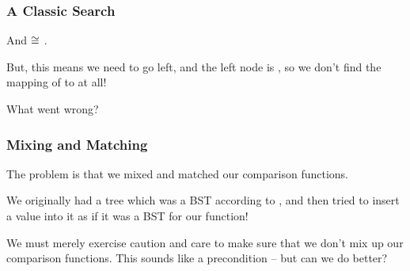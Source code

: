 \documentclass[aspectratio=169]{beamer}
\begin{document}
\begin{frame}[fragile]
  \frametitle{A Classic Search}

  \begin{center}

    \vspace{10pt}

  \end{center}

  And  $\cong$ .

  But, this means we need to go left, and the left node is , so
  we don't find the mapping of  to  at all!

  What went wrong?
\end{frame}

\begin{frame}[fragile]
  \frametitle{Mixing and Matching}

  The problem is that we mixed and matched our comparison functions.

  We originally had a tree which was a BST according to ,
  and then tried to insert a value into it as if it was a BST for our
   function!


  We must merely exercise caution and care to make sure that we don't mix up our
  comparison functions. This sounds like a precondition -- but can we do better?
\end{frame}

\end{document}
